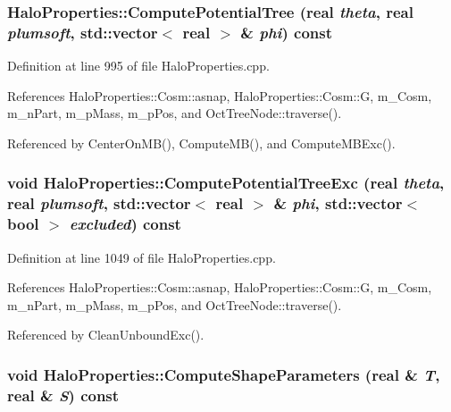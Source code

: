 \subsubsection[{ComputePotentialTree}]{ HaloProperties::ComputePotentialTree ({\bf real} {\em theta}, \/  {\bf real} {\em plumsoft}, \/  std::vector$<$ {\bf real} $>$ \& {\em phi}) const}\label{classHaloProperties_a11c11cb2443bb7852e1940617e9fd61c}


Definition at line 995 of file HaloProperties.cpp.



References HaloProperties::Cosm::asnap, HaloProperties::Cosm::G, m\_\-Cosm, m\_\-nPart, m\_\-pMass, m\_\-pPos, and OctTreeNode::traverse().



Referenced by CenterOnMB(), ComputeMB(), and ComputeMBExc().

\subsubsection[{ComputePotentialTreeExc}]{\setlength{\rightskip}{0pt plus 5cm}void HaloProperties::ComputePotentialTreeExc ({\bf real} {\em theta}, \/  {\bf real} {\em plumsoft}, \/  std::vector$<$ {\bf real} $>$ \& {\em phi}, \/  std::vector$<$ bool $>$ {\em excluded}) const}\label{classHaloProperties_a28f6e72bab9459a79bdf665fbd42deab}


Definition at line 1049 of file HaloProperties.cpp.



References HaloProperties::Cosm::asnap, HaloProperties::Cosm::G, m\_\-Cosm, m\_\-nPart, m\_\-pMass, m\_\-pPos, and OctTreeNode::traverse().



Referenced by CleanUnboundExc().

\subsubsection[{ComputeShapeParameters}]{\setlength{\rightskip}{0pt plus 5cm}void HaloProperties::ComputeShapeParameters ({\bf real} \& {\em T}, \/  {\bf real} \& {\em S}) const}\label{classHaloProperties_afaabf0499b36b0e507a855763c6a2144}


